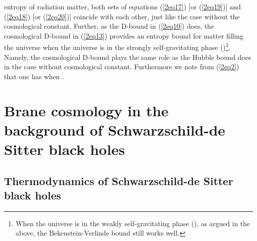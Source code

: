 \documentclass[a4paper,12pt]{article}
\providecommand{\sect}[1]{\setcounter{equation}{0}\section{#1}}
\begin{document}
entropy \coordHE{} of radiation matter, both sets of equations (\ref{2eq17}) [or
(\ref{2eq19})] and (\ref{2eq18}) [or (\ref{2eq20})] coincide with
each other, just like the case without the cosmological constant. Further,
as the D-bound in (\ref{2eq10}) does, the cosmological D-bound in (\ref{2eq13}) 
provides an entropy bound for matter filling the universe when the universe
is in the strongly self-gravitating phase (\coordHE{})\footnote{When the universe is in
the weakly self-gravitating phase (\coordHE{}), as argued in the above, the 
Bekenstein-Verlinde bound still works well.}. Namely, the cosmological D-bound
plays the same role as the Hubble bound does in the case without cosmological 
constant. Furthermore we note from (\ref{2eq2}) that one has \coordHE{} when \coordHE{}.



\sect{Brane cosmology in the background of Schwarzschild-de Sitter
black holes}

\subsection{Thermodynamics of Schwarzschild-de Sitter black holes}
\end{document}

